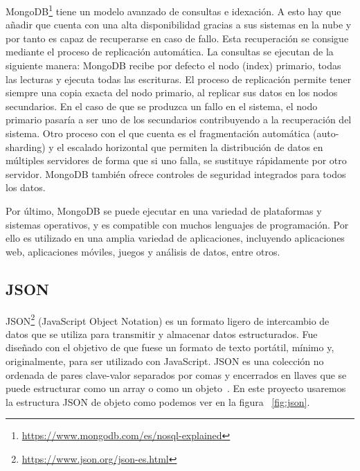 \documentclass[a4paper, 12pt]{book}
\begin{document}
MongoDB\footnote{\url{https://www.mongodb.com/es/nosql-explained}} tiene un modelo avanzado de consultas e idexación.               
A esto hay que añadir que cuenta con una alta disponibilidad gracias a sus sistemas en la nube y por tanto es capaz de recuperarse en caso de fallo. 
Esta recuperación se consigue mediante el proceso de replicación automática.
La consultas se ejecutan de la siguiente manera: MongoDB recibe por defecto el nodo (index) primario, todas las lecturas y ejecuta todas las escrituras.
El proceso de replicación permite tener siempre una copia exacta del nodo primario, al replicar sus datos en los nodos secundarios.
En el caso de que se produzca un fallo en el sistema, el nodo primario pasaría a ser uno de los secundarios contribuyendo a la recuperación del sistema. 
Otro proceso con el que cuenta es el fragmentación automática (auto-sharding) y el escalado horizontal que permiten la distribución de datos en múltiples servidores de forma que si uno falla, se sustituye rápidamente por otro servidor.
MongoDB también ofrece controles de seguridad integrados para todos los datos.


Por último, MongoDB se puede ejecutar en una variedad de plataformas y sistemas operativos, y es compatible con muchos lenguajes de programación.
Por ello es utilizado en una amplia variedad de aplicaciones, incluyendo aplicaciones web, aplicaciones móviles, juegos y análisis de datos, entre otros.


\subsection{JSON} %
\label{sec:json} %

JSON\footnote{\url{https://www.json.org/json-es.html}} (JavaScript Object Notation) es un formato ligero de intercambio de datos que se utiliza para transmitir y almacenar datos estructurados. 
Fue diseñado con el objetivo de que fuese un formato de texto portátil, mínimo y, originalmente, para ser utilizado con JavaScript. 
JSON es una colección no ordenada de pares clave-valor separados por comas y encerrados en llaves que se puede estructurar como un array o como un objeto~\cite{bray2014javascript}. 
En este proyecto usaremos la estructura JSON de objeto como podemos ver en la figura ~\ref{fig:json}. 
\end{document}

